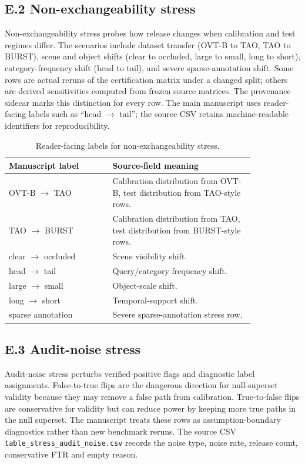 \documentclass[11pt]{article}
\begin{document}
\subsection*{E.2 Non-exchangeability stress}

Non-exchangeability stress probes how release changes when calibration and test regimes differ.
The scenarios include dataset transfer (OVT-B to TAO, TAO to BURST), scene and object shifts (clear to occluded, large to small, long to short), category-frequency shift (head to tail), and severe sparse-annotation shift.
Some rows are actual reruns of the certification matrix under a changed split; others are derived sensitivities computed from frozen source matrices.
The provenance sidecar marks this distinction for every row.
The main manuscript uses reader-facing labels such as ``head \(\to\) tail''; the source CSV retains machine-readable identifiers for reproducibility.

\begin{table}[h]
\centering
\caption{Reader-facing labels for non-exchangeability stress.}
\small
\begin{tabular}{p{0.35\linewidth}p{0.48\linewidth}}
\toprule
Manuscript label & Source-field meaning \\
\midrule
OVT-B \(\to\) TAO & Calibration distribution from OVT-B, test distribution from TAO-style rows. \\
TAO \(\to\) BURST & Calibration distribution from TAO, test distribution from BURST-style rows. \\
clear \(\to\) occluded & Scene visibility shift. \\
head \(\to\) tail & Query/category frequency shift. \\
large \(\to\) small & Object-scale shift. \\
long \(\to\) short & Temporal-support shift. \\
sparse annotation & Severe sparse-annotation stress row. \\
\bottomrule
\end{tabular}
\end{table}

\subsection*{E.3 Audit-noise stress}

Audit-noise stress perturbs verified-positive flags and diagnostic label assignments.
False-to-true flips are the dangerous direction for null-superset validity because they may remove a false path from calibration.
True-to-false flips are conservative for validity but can reduce power by keeping more true paths in the null superset.
The manuscript treats these rows as assumption-boundary diagnostics rather than new benchmark reruns.
The source CSV \texttt{table\_stress\_audit\_noise.csv} records the noise type, noise rate, release count, conservative FTR and empty reason.
\end{document}
